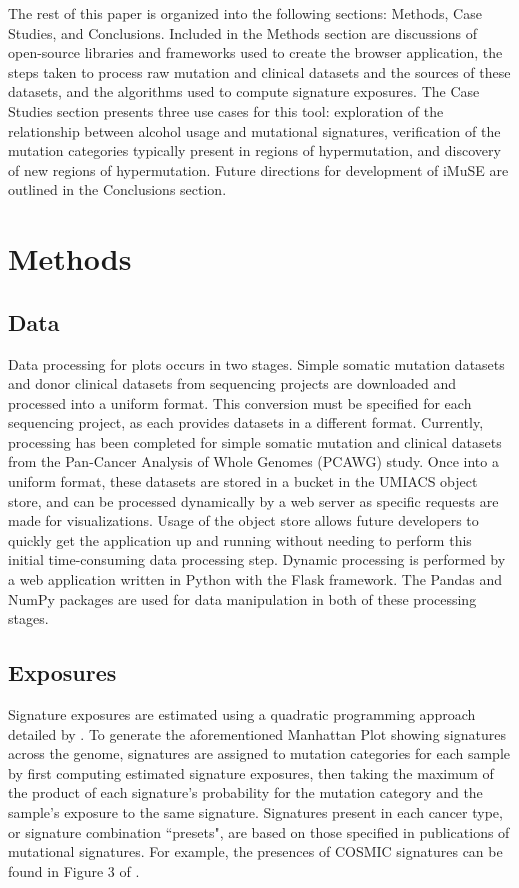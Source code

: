 \documentclass[12pt, letterpaper]{article}
\begin{document}
The rest of this paper is organized into the following sections: Methods, Case Studies, and Conclusions. Included in the Methods section are discussions of open-source libraries and frameworks used to create the browser application, the steps taken to process raw mutation and clinical datasets and the sources of these datasets, and the algorithms used to compute signature exposures. The Case Studies section presents three use cases for this tool: exploration of the relationship between alcohol usage and mutational signatures, verification of the mutation categories typically present in regions of hypermutation, and discovery of new regions of hypermutation. Future directions for development of iMuSE are outlined in the Conclusions section.


\section{Methods}
\subsection{Data}
Data processing for plots occurs in two stages. 
Simple somatic mutation datasets and donor clinical datasets from sequencing projects are downloaded and processed into a uniform format. 
This conversion must be specified for each sequencing project, as each provides datasets in a different format.
Currently, processing has been completed for simple somatic mutation and clinical datasets from the Pan-Cancer Analysis of Whole Genomes (PCAWG) study.
Once into a uniform format, these datasets are stored in a bucket in the UMIACS object store, and can be processed dynamically by a web server as specific requests are made for visualizations.
Usage of the object store allows future developers to quickly get the application up and running without needing to perform this initial time-consuming data processing step.
Dynamic processing is performed by a web application written in Python with the Flask framework. 
The Pandas and NumPy packages are used for data manipulation in both of these processing stages.

\subsection{Exposures}
Signature exposures are estimated using a quadratic programming approach detailed by \citet{huang2017detecting}.
To generate the aforementioned Manhattan Plot showing signatures across the genome, signatures are assigned to mutation categories for each sample by first computing estimated signature exposures, then taking the maximum of the product of each signature's probability for the mutation category and the sample's exposure to the same signature.
Signatures present in each cancer type, or signature combination ``presets", are based on those specified in publications of mutational signatures.
For example, the presences of COSMIC signatures can be found in Figure 3 of \citet{alexandrov2013signatures}.
\end{document}
